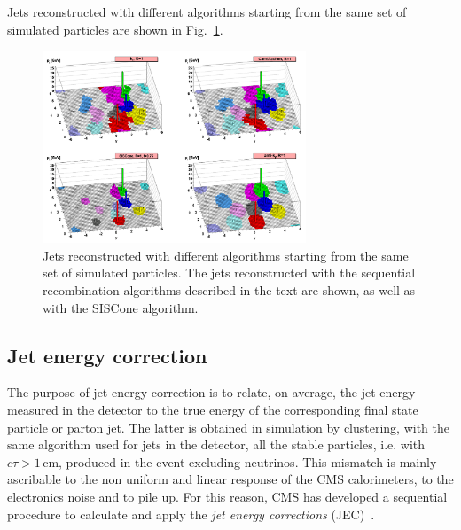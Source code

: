 Jets reconstructed with different algorithms starting from the same set of simulated particles are shown in Fig.~\ref{fig:jets}.

\begin{figure}[htb]
\centering
\includegraphics[width=0.7\textwidth]{images/jets.png}
\caption{Jets reconstructed with different algorithms starting from the same set of simulated particles. The jets reconstructed with the sequential recombination algorithms described in the text are shown, as well as with the SISCone algorithm.}\label{fig:jets}
\end{figure}

\subsection{Jet energy correction}

The purpose of jet energy correction is to relate, on average, the jet energy measured in the detector to the true energy of the corresponding final state particle or parton jet. The latter is obtained in simulation by clustering, with the same algorithm used for jets in the detector, all the stable particles, i.e. with $c\tau > 1$\,cm, produced in the event excluding neutrinos. This mismatch is mainly ascribable to the non uniform and linear response of the CMS calorimeters, to the electronics noise and to pile up. For this reason, CMS has developed a sequential procedure to calculate and apply the \emph{jet energy corrections} (JEC)~\cite{Chatrchyan:2011ds}.

